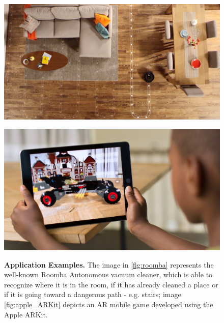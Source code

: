 \begin{figure}[!hbt]
    \centering
    \begin{minipage}[t!]{0.4\textwidth}
        \centering
        \includegraphics[width=\textwidth]{figures/00_intro/roomba_cleaning.jpg}
        \label{fig:roomba}
    \end{minipage} \hspace{10px}
    \begin{minipage}[t!]{0.4\textwidth}
        \centering
        \includegraphics[width=\textwidth]{figures/00_intro/apple_ARKit.jpg}
        \label{fig:apple_ARKit}
    \end{minipage}%
    
    \caption{\textbf{Application Examples.} The image in \ref{fig:roomba} represents the well-known Roomba Autonomous vacuum cleaner, which is able to recognize where it is in the room, if it has already cleaned a place or if it is going toward a dangerous path - e.g. stairs; image \ref{fig:apple_ARKit} depicts an AR mobile game developed using the Apple ARKit.} 
    \label{fig:applications}
\end{figure}

